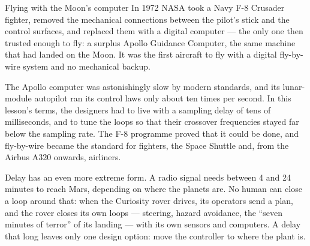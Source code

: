 \begin{curiosity}{Flying with the Moon's computer}
In 1972 NASA took a Navy F-8 Crusader fighter, removed the mechanical connections between the pilot's stick and the control surfaces, and replaced them with a digital computer — the only one then trusted enough to fly: a surplus Apollo Guidance Computer, the same machine that had landed on the Moon. It was the first aircraft to fly with a digital fly-by-wire system and no mechanical backup.

The Apollo computer was astonishingly slow by modern standards, and its lunar-module autopilot ran its control laws only about ten times per second. In this lesson's terms, the designers had to live with a sampling delay of tens of milliseconds, and to tune the loops so that their crossover frequencies stayed far below the sampling rate. The F-8 programme proved that it could be done, and fly-by-wire became the standard for fighters, the Space Shuttle and, from the Airbus A320 onwards, airliners.

Delay has an even more extreme form. A radio signal needs between 4 and 24 minutes to reach Mars, depending on where the planets are. No human can close a loop around that: when the Curiosity rover drives, its operators send a plan, and the rover closes its own loops — steering, hazard avoidance, the \enquote{seven minutes of terror} of its landing — with its own sensors and computers. A delay that long leaves only one design option: move the controller to where the plant is.
\end{curiosity}

